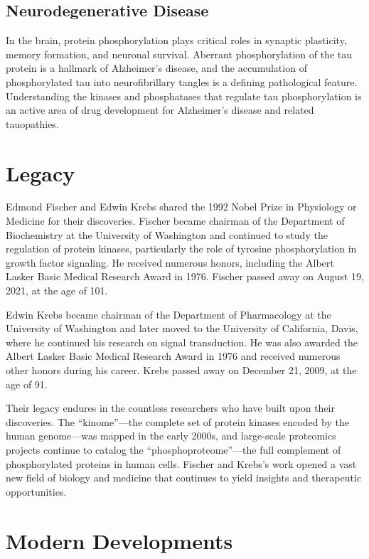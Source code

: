 \subsection{Neurodegenerative Disease}

In the brain, protein phosphorylation plays critical roles in synaptic plasticity, memory formation, and neuronal survival. Aberrant phosphorylation of the tau protein is a hallmark of Alzheimer's disease, and the accumulation of phosphorylated tau into neurofibrillary tangles is a defining pathological feature. Understanding the kinases and phosphatases that regulate tau phosphorylation is an active area of drug development for Alzheimer's disease and related tauopathies.

\section{Legacy}

Edmond Fischer and Edwin Krebs shared the 1992 Nobel Prize in Physiology or Medicine for their discoveries. Fischer became chairman of the Department of Biochemistry at the University of Washington and continued to study the regulation of protein kinases, particularly the role of tyrosine phosphorylation in growth factor signaling. He received numerous honors, including the Albert Lasker Basic Medical Research Award in 1976. Fischer passed away on August 19, 2021, at the age of 101.

Edwin Krebs became chairman of the Department of Pharmacology at the University of Washington and later moved to the University of California, Davis, where he continued his research on signal transduction. He was also awarded the Albert Lasker Basic Medical Research Award in 1976 and received numerous other honors during his career. Krebs passed away on December 21, 2009, at the age of 91.

Their legacy endures in the countless researchers who have built upon their discoveries. The ``kinome''---the complete set of protein kinases encoded by the human genome---was mapped in the early 2000s, and large-scale proteomics projects continue to catalog the ``phosphoproteome''---the full complement of phosphorylated proteins in human cells. Fischer and Krebs's work opened a vast new field of biology and medicine that continues to yield insights and therapeutic opportunities.


\section{Modern Developments}

